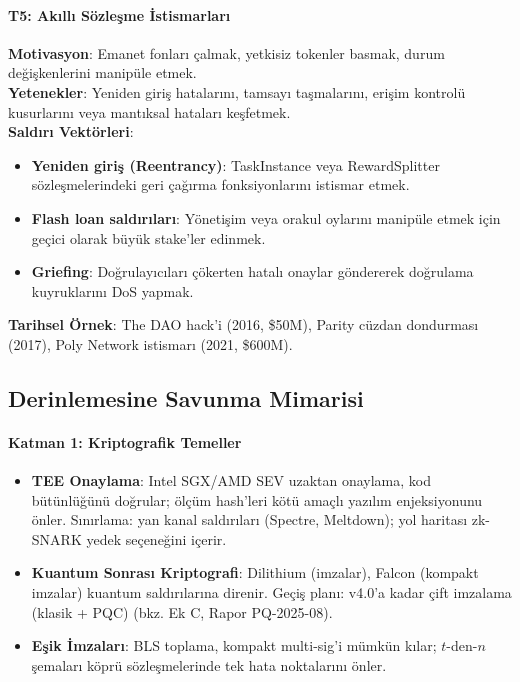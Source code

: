 \documentclass[11pt]{article}
\begin{document}
\begin{itemize}[noitemsep]
\begin{itemize}[noitemsep]
\begin{itemize}[noitemsep]
\begin{itemize}[noitemsep]
\begin{itemize}[noitemsep]
\begin{itemize}[noitemsep]
\begin{itemize}[noitemsep]
\begin{enumerate}[noitemsep]
\begin{itemize}[noitemsep]
\paragraph{T5: Akıllı Sözleşme İstismarları}
\textbf{Motivasyon}: Emanet fonları çalmak, yetkisiz tokenler basmak, durum değişkenlerini manipüle etmek.\\
\textbf{Yetenekler}: Yeniden giriş hatalarını, tamsayı taşmalarını, erişim kontrolü kusurlarını veya mantıksal hataları keşfetmek.\\
\textbf{Saldırı Vektörleri}:
\begin{itemize}[noitemsep]
  \item \textbf{Yeniden giriş (Reentrancy)}: TaskInstance veya RewardSplitter sözleşmelerindeki geri çağırma fonksiyonlarını istismar etmek.
  \item \textbf{Flash loan saldırıları}: Yönetişim veya orakul oylarını manipüle etmek için geçici olarak büyük stake'ler edinmek.
  \item \textbf{Griefing}: Doğrulayıcıları çökerten hatalı onaylar göndererek doğrulama kuyruklarını DoS yapmak.
\end{itemize}
\textbf{Tarihsel Örnek}: The DAO hack'i (2016, \$50M), Parity cüzdan dondurması (2017), Poly Network istismarı (2021, \$600M).

\subsection{Derinlemesine Savunma Mimarisi}

\paragraph{Katman 1: Kriptografik Temeller}
\begin{itemize}[noitemsep]
  \item \textbf{TEE Onaylama}: Intel SGX/AMD SEV uzaktan onaylama, kod bütünlüğünü doğrular; ölçüm hash'leri kötü amaçlı yazılım enjeksiyonunu önler. Sınırlama: yan kanal saldırıları (Spectre, Meltdown); yol haritası zk-SNARK yedek seçeneğini içerir.
  \item \textbf{Kuantum Sonrası Kriptografi}: Dilithium (imzalar), Falcon (kompakt imzalar) kuantum saldırılarına direnir. Geçiş planı: v4.0'a kadar çift imzalama (klasik + PQC) (bkz. Ek C, Rapor PQ-2025-08).
  \item \textbf{Eşik İmzaları}: BLS toplama, kompakt multi-sig'i mümkün kılar; $t$-den-$n$ şemaları köprü sözleşmelerinde tek hata noktalarını önler.
\end{itemize}


\end{itemize}
\end{enumerate}
\end{itemize}
\end{itemize}
\end{itemize}
\end{itemize}
\end{itemize}
\end{itemize}
\end{itemize}
\end{document}
